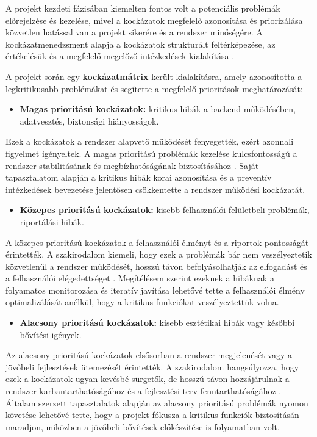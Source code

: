 A projekt kezdeti fázisában kiemelten fontos volt a potenciális problémák előrejelzése és kezelése, 
mivel a kockázatok megfelelő azonosítása és priorizálása közvetlen hatással van a projekt sikerére 
és a rendszer minőségére. A kockázatmenedzsment alapja a kockázatok strukturált feltérképezése, 
az értékelésük és a megfelelő megelőző intézkedések kialakítása \cite{Hajdu2014,Szalay2018,Kovacs2016}.

A projekt során egy \textbf{kockázatmátrix} került kialakításra, amely azonosította a legkritikusabb problémákat és segítette a megfelelő prioritások meghatározását:

\begin{itemize}
    \item \textbf{Magas prioritású kockázatok:} kritikus hibák a backend működésében, adatvesztés, biztonsági hiányosságok.
\end{itemize}

Ezek a kockázatok a rendszer alapvető működését fenyegették, ezért azonnali figyelmet igényeltek. 
A magas prioritású problémák kezelése kulcsfontosságú a 
rendszer stabilitásának és megbízhatóságának biztosításához \cite{Kaposi2019,Szalay2018}. Saját tapasztalatom alapján a kritikus 
hibák korai azonosítása és a preventív intézkedések bevezetése jelentősen csökkentette a rendszer működési kockázatát.

\begin{itemize}
    \item \textbf{Közepes prioritású kockázatok:} kisebb felhasználói felületbeli problémák, riportálási hibák.
\end{itemize}

A közepes prioritású kockázatok a felhasználói élményt és a riportok pontosságát érintették. 
A szakirodalom kiemeli, hogy ezek a problémák bár nem veszélyeztetik közvetlenül a rendszer működését, 
hosszú távon befolyásolhatják az elfogadást és a felhasználói elégedettséget \cite{Hajdu2014,Kovacs2016}. 
Megítélésem szerint ezeknek a hibáknak a folyamatos monitorozása és iteratív javítása lehetővé tette 
a felhasználói élmény optimalizálását anélkül, hogy a kritikus funkciókat veszélyeztettük volna.

\begin{itemize}
    \item \textbf{Alacsony prioritású kockázatok:} kisebb esztétikai hibák vagy későbbi bővítési igények.
\end{itemize}

Az alacsony prioritású kockázatok elsősorban a rendszer megjelenését vagy a jövőbeli fejlesztések 
ütemezését érintették. A szakirodalom hangsúlyozza, hogy ezek a kockázatok ugyan kevésbé sürgetők, 
de hosszú távon hozzájárulnak a rendszer karbantarthatóságához és a fejlesztési terv fenntarthatóságához \cite{Szalay2018,Kaposi2019}. 
Általam szerzett tapasztalatok alapján az alacsony prioritású problémák nyomon követése lehetővé tette, hogy 
a projekt fókusza a kritikus funkciók biztosításán maradjon, miközben a jövőbeli bővítések előkészítése is folyamatban volt.

